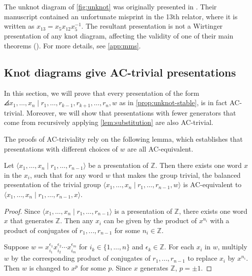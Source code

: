 \begin{remark}
The unknot diagram of \autoref{fig:unknot} was originally presented in \cite{MMS}. Their manuscript contained an unfortunate misprint in the 13th relator, where it is written as $x_{13}=x_5 x_{12} x_5^{-1}$.  The resultant presentation is not a Wirtinger presentation of any knot diagram, affecting the validity of one of their main theorems (\cite[Theorem 1.4]{MMS}). For more details, see \autoref{app:mms}.
\end{remark}


\subsection{Knot diagrams give AC-trivial presentations} \label{sec:proofs}
In this section, we will prove that every presentation of the form  
 $\angles{ x_1,\ldots, x_n \mid r_1,\ldots, r_{k-1}, r_{k+1},\ldots, r_n, w}$ as in \autoref{prop:unknot-stable}, is in fact AC-trivial. Moreover, we will show that presentations with fewer generators that come from recursively applying \autoref{lem:substitution} are also AC-trivial. 

The proofs of AC-triviality rely on the following lemma, which establishes that presentations with different choices of $w$ are all AC-equivalent. 

\begin{lemma}
\label{lem:all_ac_equiv}
    Let $\langle x_1,\ldots, x_n \mid r_1,\ldots,r_{n-1}\rangle$ be a presentation of $\mathbb{Z}$. Then there exists one word $x$ in the $x_i$, such that for any word $w$ that makes the group trivial, the balanced presentation of the trivial group $\langle x_1,\ldots, x_n \mid r_1,\ldots,r_{n-1}, w\rangle$ is AC-equivalent to $\langle x_1,\ldots, x_n \mid r_1,\ldots,r_{n-1}, x\rangle$.
\end{lemma}

\begin{proof}[Proof]
    Since $\langle x_1,\ldots, x_n \mid r_1,\ldots,r_{n-1}\rangle$ is a presentation of $\mathbb{Z}$, there exists one word $x$ that generates $\mathbb{Z}$. Then any $x_i$ can be given by the product of $x^{n_i}$ with a product of conjugates of $r_1,...,r_{n-1}$ for some $n_i\in\mathbb{Z}$.

Suppose $w=x_{i_1}^{\epsilon_ 1}x_{i_2}^{\epsilon_2}\cdots x_{i_m}^{\epsilon_m}$ for $i_k\in \{1,\ldots,n\}$ and $\epsilon_k\in\mathbb{Z}$. For each $x_i$ in $w$, multiply $w$ by the corresponding product of conjugates of $r_1,...,r_{n-1}$ to replace $x_i$ by $x^{n_i}$. Then $w$ is changed to $x^p$ for some $p$. Since $x$ generates $\mathbb{Z}$, $p=\pm 1$. 
\end{proof}


